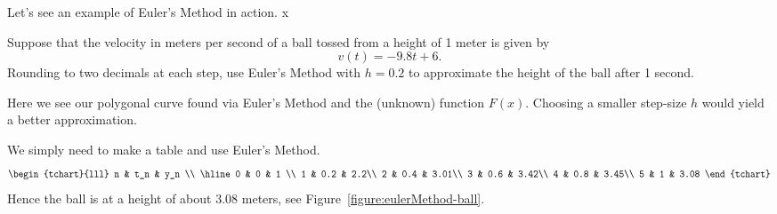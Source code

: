 Let's see an example of Euler's Method in action.
x
\begin{example}
Suppose that the velocity in meters per second of a ball tossed from a
height of 1 meter is given by
\[
v(t) = -9.8t + 6.
\]
Rounding to two decimals at each step, use Euler's Method with $h=0.2$
to approximate the height of the ball after 1 second.
\end{example}
\begin{marginfigure}[0in]
\caption{Here we see our polygonal curve found via Euler's Method and
  the (unknown) function $F(x)$. Choosing a smaller step-size $h$
  would yield a better approximation.}
\label{figure:eulerMethod-ball}
\end{marginfigure}

\begin{solution}
We simply need to make a table and use Euler's Method.
\[
\begin{tchart}{lll}
n & t_n & y_n \\ \hline
0 & 0   & 1 \\
1 & 0.2 & 2.2\\
2 & 0.4 & 3.01\\
3 & 0.6 & 3.42\\
4 & 0.8 & 3.45\\
5 & 1 & 3.08
\end{tchart}
\]
Hence the ball is at a height of about $3.08$ meters, see
Figure~\ref{figure:eulerMethod-ball}.
\end{solution}



